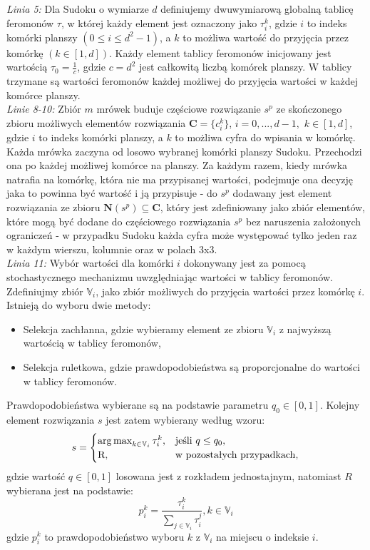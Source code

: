 \documentclass[11pt]{scrartcl} %
\begin{document}
\textit{Linia 5:} Dla Sudoku o wymiarze $d$ definiujemy dwuwymiarową globalną tablicę feromonów $\tau$, w której każdy element jest oznaczony jako $\tau_{i}^{k}$, gdzie $i$ to indeks komórki planszy $(0\leq{i}\leq{d^2-1})$, a $k$ to możliwa wartość do przyjęcia przez komórkę $(k\in{[1,d]})$. Każdy element tablicy feromonów inicjowany jest wartością $\tau_{0}=\frac{1}{c}$, gdzie $c=d^2$ jest całkowitą liczbą komórek planszy. W tablicy trzymane są wartości feromonów każdej możliwej do przyjęcia wartości w każdej komórce planszy.\\

\textit{Linie 8-10:} Zbiór $m$ mrówek buduje częściowe rozwiązanie $s^p$ ze skończonego zbioru możliwych elementów rozwiązania $\textbf{C} = \{c_{i}^{k}\}$, $i=0,...,d-1,$ $k\in{[1,d]}$, gdzie $i$ to indeks komórki planszy, a $k$ to możliwa cyfra do wpisania w komórkę. Każda mrówka zaczyna od losowo wybranej komórki planszy Sudoku. Przechodzi ona po każdej możliwej komórce na planszy. Za każdym razem, kiedy mrówka natrafia na komórkę, która nie ma przypisanej wartości, podejmuje ona decyzję jaka to powinna być wartość i ją przypisuje - do $s^p$ dodawany jest element rozwiązania ze zbioru $\textbf{N}(s^p)\subseteq{\textbf{C}}$, który jest zdefiniowany jako zbiór elementów, które mogą być dodane do częściowego rozwiązania $s^p$ bez naruszenia założonych ograniczeń - w przypadku Sudoku każda cyfra może występować tylko jeden raz w każdym wierszu, kolumnie oraz w polach 3x3.\\

\textit{Linia 11:} Wybór wartości dla komórki $i$ dokonywany jest za pomocą stochastycznego mechanizmu uwzględniając wartości w tablicy feromonów. Zdefiniujmy zbiór $\mathbb{V}_i$, jako zbiór możliwych do przyjęcia wartości przez komórkę $i$. Istnieją do wyboru dwie metody:
\begin{itemize}
	\item Selekcja zachłanna, gdzie wybieramy element ze zbioru $\mathbb{V}_i$ z najwyższą wartością w tablicy feromonów, 
	\item Selekcja ruletkowa, gdzie prawdopodobieństwa są proporcjonalne do wartości w tablicy feromonów. 
\end{itemize}
Prawdopodobieństwa wybierane są na podstawie parametru $ q_0\in{[0,1]} $. Kolejny element rozwiązania $s$ jest zatem wybierany według wzoru:
\begin{equation}
s = \begin{cases}
\argmax_{{k\in\mathbb{V}_i}}{\tau_i^k}, & \text{jeśli $q\leq{q_0}$},\\
$R$, & \text{w pozostałych przypadkach},
\end{cases}
\end{equation}
gdzie wartość $ q \in{[0,1]}$ losowana jest z rozkładem jednostajnym, natomiast $R$ wybierana jest na podstawie:
\begin{equation}
p_{i}^{k} =
\dfrac{\tau_{i}^{k}}{\sum_{j\in{\mathbb{V}_i}}{\tau_i^j}}, k\in\mathbb{V}_i
\end{equation}
gdzie $p_{i}^{k}$ to prawdopodobieństwo wyboru $k$ z $\mathbb{V}_i$ na miejscu o indeksie $i$.\\
\end{document}
